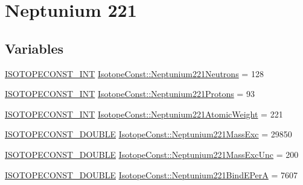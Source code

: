 \hypertarget{group___isotope_const-_neptunium-_np221}{}\section{Neptunium 221}
\label{group___isotope_const-_neptunium-_np221}
\subsection*{Variables}
\begin{DoxyCompactItemize}
\item 
\mbox{\hyperlink{group___isotope_const-_macros_ga5f18360b3e99483a35c32d789e62621c}{I\+S\+O\+T\+O\+P\+E\+C\+O\+N\+S\+T\+\_\+\+I\+NT}} \mbox{\hyperlink{group___isotope_const-_neptunium-_np221_gae0d92609d81f0aaf49f5ae5849c67e4a}{Isotope\+Const\+::\+Neptunium221\+Neutrons}} = 128
\item 
\mbox{\hyperlink{group___isotope_const-_macros_ga5f18360b3e99483a35c32d789e62621c}{I\+S\+O\+T\+O\+P\+E\+C\+O\+N\+S\+T\+\_\+\+I\+NT}} \mbox{\hyperlink{group___isotope_const-_neptunium-_np221_ga64dcd9578829203c20e1f5b41e9e4876}{Isotope\+Const\+::\+Neptunium221\+Protons}} = 93
\item 
\mbox{\hyperlink{group___isotope_const-_macros_ga5f18360b3e99483a35c32d789e62621c}{I\+S\+O\+T\+O\+P\+E\+C\+O\+N\+S\+T\+\_\+\+I\+NT}} \mbox{\hyperlink{group___isotope_const-_neptunium-_np221_gad35d6800625446930ee0b184c4b99069}{Isotope\+Const\+::\+Neptunium221\+Atomic\+Weight}} = 221
\item 
\mbox{\hyperlink{group___isotope_const-_macros_ga8f45a7272ce02c0b4c65c44636ed719a}{I\+S\+O\+T\+O\+P\+E\+C\+O\+N\+S\+T\+\_\+\+D\+O\+U\+B\+LE}} \mbox{\hyperlink{group___isotope_const-_neptunium-_np221_ga48b216eacce40a4b32d9aef9865c9d5d}{Isotope\+Const\+::\+Neptunium221\+Mass\+Exc}} = 29850
\item 
\mbox{\hyperlink{group___isotope_const-_macros_ga8f45a7272ce02c0b4c65c44636ed719a}{I\+S\+O\+T\+O\+P\+E\+C\+O\+N\+S\+T\+\_\+\+D\+O\+U\+B\+LE}} \mbox{\hyperlink{group___isotope_const-_neptunium-_np221_ga9555bc595651d0f63cbb3aab049ac697}{Isotope\+Const\+::\+Neptunium221\+Mass\+Exc\+Unc}} = 200
\item 
\mbox{\hyperlink{group___isotope_const-_macros_ga8f45a7272ce02c0b4c65c44636ed719a}{I\+S\+O\+T\+O\+P\+E\+C\+O\+N\+S\+T\+\_\+\+D\+O\+U\+B\+LE}} \mbox{\hyperlink{group___isotope_const-_neptunium-_np221_ga43645b9575d0b6c02438fad44073bf08}{Isotope\+Const\+::\+Neptunium221\+Bind\+E\+PerA}} = 7607
\item 

\end{DoxyCompactItemize}
